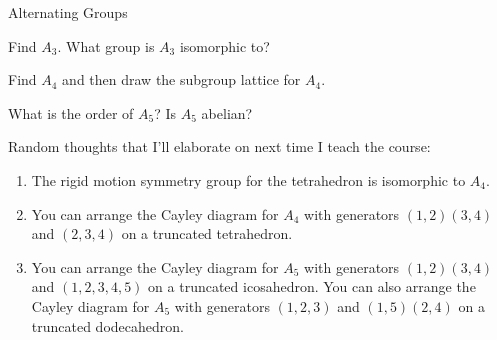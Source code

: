 \begin{section}{Alternating Groups}
\begin{exercise}
Find $A_3$.  What group is $A_3$ isomorphic to?
\end{exercise}

\begin{exercise}
Find $A_4$ and then draw the subgroup lattice for $A_4$.
\end{exercise}

\begin{exercise}
What is the order of $A_5$?  Is $A_5$ abelian?
\end{exercise}

Random thoughts that I'll elaborate on next time I teach the course:
\begin{enumerate}
\item The rigid motion symmetry group for the tetrahedron is isomorphic to $A_4$.
\item You can arrange the Cayley diagram for $A_4$ with generators $(1,2)(3,4)$ and $(2,3,4)$ on a truncated tetrahedron. 
\item You can arrange the Cayley diagram for $A_5$ with generators $(1,2)(3,4)$ and $(1,2,3,4,5)$ on a truncated icosahedron.  You can also arrange the Cayley diagram for $A_5$ with generators $(1,2,3)$ and $(1,5)(2,4)$ on a truncated dodecahedron. 
\end{enumerate}

\end{section}